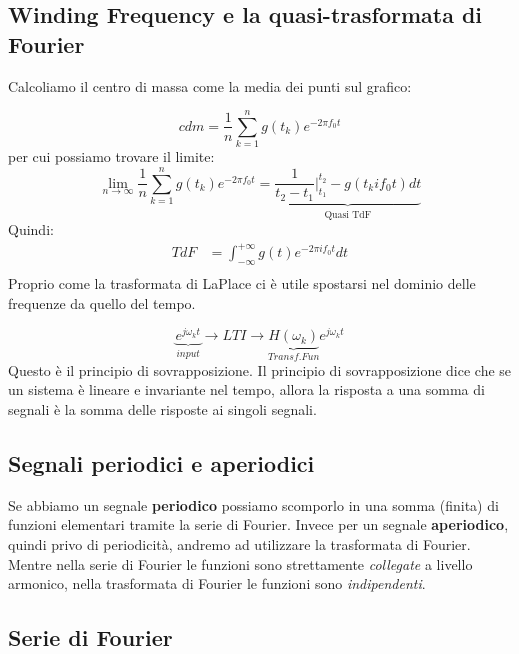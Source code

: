\documentclass[a4paper]{article}
\begin{document}
\subsection{Winding Frequency e la quasi-trasformata di Fourier}

Calcoliamo il centro di massa come la media dei punti sul grafico:

\[cdm = \frac{1}{n} \sum_{k=1}^n g(t_k)e^{-2\pi f_0t}\]
per cui possiamo trovare il limite:
\[\lim_{n \rightarrow \infty} \frac{1}{n} \sum_{k=1}^n g(t_k)e^{-2\pi f_0t} = \underbrace{\frac{1}{t_2 - t_1}\bigg|_{t_1}^{t_2} -g(t_k i f_0t) dt}_{\text{Quasi TdF}}\]
Quindi:
\begin{align*}
    TdF &= \int_{-\infty}^{+\infty} g(t)e^{-2\pi i f_0t} dt\\
\end{align*}
Proprio come la trasformata di LaPlace ci è utile spostarsi nel dominio delle frequenze da quello del tempo.


\[\underbrace{e^{j\omega_k t}}_{input} \rightarrow LTI \rightarrow \underbrace{H(\omega_k)}_{Transf. Fun}e^{j\omega_k t}\]
Questo è il principio di sovrapposizione. Il principio di sovrapposizione dice 
che se un sistema è lineare e invariante nel tempo, allora la risposta a una somma di segnali è la somma delle risposte ai singoli segnali.

\subsection{Segnali periodici e aperiodici}

Se abbiamo un segnale \textbf{periodico} possiamo scomporlo in una somma (finita) di funzioni elementari tramite la serie di Fourier.
Invece per un segnale \textbf{aperiodico}, quindi privo di periodicità, andremo ad utilizzare la trasformata di Fourier.
Mentre nella serie di Fourier le funzioni sono strettamente \textit{collegate} a livello armonico, nella trasformata di Fourier le funzioni sono \textit{indipendenti}.

\subsection{Serie di Fourier}
\end{document}
